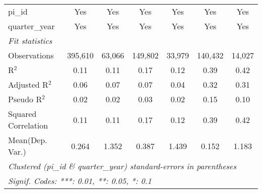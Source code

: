 \begin{tabular}{lcccccc}
   pi\_id                                                     & Yes           & Yes           & Yes           & Yes           & Yes           & Yes\\  
   quarter\_year                                              & Yes           & Yes           & Yes           & Yes           & Yes           & Yes\\  
   \midrule
   \emph{Fit statistics}\\
   Observations                                               & 395,610       & 63,066        & 149,802       & 33,979        & 140,432       & 14,027\\  
   R$^2$                                                      & 0.11          & 0.11          & 0.17          & 0.12          & 0.39          & 0.42\\  
   Adjusted R$^2$                                             & 0.06          & 0.07          & 0.07          & 0.04          & 0.32          & 0.31\\  
   Pseudo R$^2$                                               & 0.02          & 0.02          & 0.03          & 0.02          & 0.15          & 0.10\\  
   Squared Correlation                                        & 0.11          & 0.11          & 0.17          & 0.12          & 0.39          & 0.42\\  
Mean(Dep. Var.) & 0.264 & 1.352 & 0.387 & 1.439 & 0.152 & 1.183 \\
   \midrule \midrule
   \multicolumn{7}{l}{\emph{Clustered (pi\_id \& quarter\_year) standard-errors in parentheses}}\\
   \multicolumn{7}{l}{\emph{Signif. Codes: ***: 0.01, **: 0.05, *: 0.1}}\\
\end{tabular}
\par\endgroup
